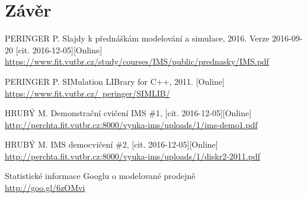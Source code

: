 \documentclass[12pt,a4paper,titlepage]{article}
\begin{document}
\section{Závěr}
\begin{enumerate}[label={[\arabic*]}]
\item PERINGER P. Slajdy k přednáškám modelování a simulace, 2016. Verze  2016-09-20 [cit. 2016-12-05][Online] \\
     \href{https://www.fit.vutbr.cz/study/courses/IMS/public/prednasky/IMS.pdf}
          {https://www.fit.vutbr.cz/study/courses/IMS/public/prednasky/IMS.pdf}
     \label{prezentace}

\item PERINGER P. SIMulation LIBrary for C++, 2011. [Online] \\
    \href{https://www.fit.vutbr.cz/~peringer/SIMLIB/}
         {https://www.fit.vutbr.cz/~peringer/SIMLIB/}
    \label{demo1}

\item HRUBÝ M. Demonstrační cvičení IMS \#1, [cit. 2016-12-05][Online] \\
    \href{http://perchta.fit.vutbr.cz:8000/vyuka-ims/uploads/1/ims-demo1.pdf}
        {http://perchta.fit.vutbr.cz:8000/vyuka-ims/uploads/1/ims-demo1.pdf}
    \label{demo2}

\item HRUBÝ M. IMS democvičení \#2, [cit. 2016-12-05][Online] \\
    \href{http://perchta.fit.vutbr.cz:8000/vyuka-ims/uploads/1/diskr2-2011.pdf}
        {http://perchta.fit.vutbr.cz:8000/vyuka-ims/uploads/1/diskr2-2011.pdf}
    \label{simlib}

\item Statistické informace Googlu o modelované prodejně \\
     \href{http://goo.gl/6zOMvi}
          {http://goo.gl/6zOMvi}
     \label{google-shop}
\end{enumerate}
\end{document}
